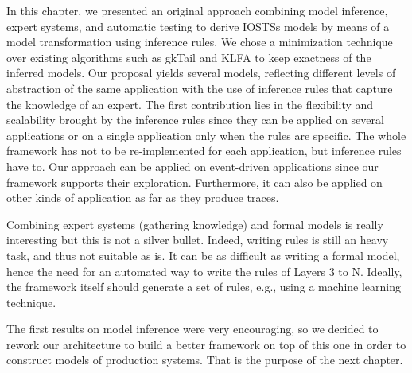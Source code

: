 In this chapter, we presented an original approach combining
model inference, expert systems, and automatic testing to derive
IOSTSs models by means of a model transformation using inference
rules.  We chose a minimization technique over existing
algorithms such as gkTail and KLFA to keep exactness of the
inferred models. Our proposal yields several models, reflecting
different levels of abstraction of the same application with the
use of inference rules that capture the knowledge of an expert.
The first contribution lies in the flexibility and scalability
brought by the inference rules since they can be applied on
several applications or on a single application only when the
rules are specific. The whole framework has not to be
re-implemented for each application, but inference rules have to.
Our approach can be applied on event-driven applications since
our framework supports their exploration. Furthermore, it can
also be applied on other kinds of application as far as they
produce traces.

Combining expert systems (gathering knowledge) and formal models
is really interesting but this is not a silver bullet. Indeed,
writing rules is still an heavy task, and thus not suitable as
is. It can be as difficult as writing a formal model, hence the
need for an automated way to write the rules of Layers 3 to N.
Ideally, the framework itself should generate a set of rules,
e.g., using a machine learning technique.

The first results on model inference were very encouraging, so we
decided to rework our architecture to build a better framework on
top of this one in order to construct models of production
systems. That is the purpose of the next chapter.
